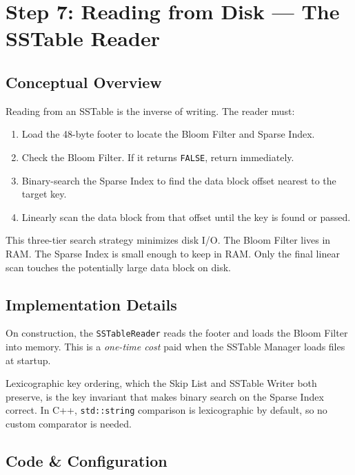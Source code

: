 \documentclass[11pt,a4paper]{article}
\begin{document}
\section{Step 7: Reading from Disk --- The SSTable Reader}
\label{sec:sstable_reader}

\subsection{Conceptual Overview}

Reading from an SSTable is the inverse of writing. The reader must:
\begin{enumerate}[noitemsep]
    \item Load the 48-byte footer to locate the Bloom Filter and Sparse Index.
    \item Check the Bloom Filter. If it returns \texttt{FALSE}, return immediately.
    \item Binary-search the Sparse Index to find the data block offset nearest to the target key.
    \item Linearly scan the data block from that offset until the key is found or passed.
\end{enumerate}

This three-tier search strategy minimizes disk I/O. The Bloom Filter lives in
RAM. The Sparse Index is small enough to keep in RAM. Only the final linear
scan touches the potentially large data block on disk.

\subsection{Implementation Details}

On construction, the \texttt{SSTableReader} reads the footer and loads the
Bloom Filter into memory. This is a \emph{one-time cost} paid when the
SSTable Manager loads files at startup.

Lexicographic key ordering, which the Skip List and SSTable Writer both
preserve, is the key invariant that makes binary search on the Sparse Index
correct. In C++, \texttt{std::string} comparison is lexicographic by default,
so no custom comparator is needed.

\subsection{Code \& Configuration}
\end{document}

